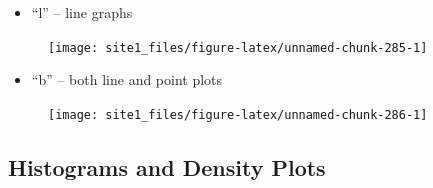 \documentclass[]{book}
\newenvironment{Shaded}{\begin{snugshade}}{\end{snugshade}}
\newcommand{\KeywordTok}[1]{\textcolor[rgb]{0.13,0.29,0.53}{\textbf{#1}}}
\newcommand{\DataTypeTok}[1]{\textcolor[rgb]{0.13,0.29,0.53}{#1}}
\newcommand{\StringTok}[1]{\textcolor[rgb]{0.31,0.60,0.02}{#1}}
\newcommand{\CommentTok}[1]{\textcolor[rgb]{0.56,0.35,0.01}{\textit{#1}}}
\newcommand{\OperatorTok}[1]{\textcolor[rgb]{0.81,0.36,0.00}{\textbf{#1}}}
\newcommand{\NormalTok}[1]{#1}
\providecommand{\tightlist}{%
  \setlength{\itemsep}{0pt}\setlength{\parskip}{0pt}}
\begin{document}
\begin{itemize}
\tightlist
\item
  ``l'' -- line graphs
\end{itemize}

\begin{Shaded}
\end{Shaded}

\begin{figure}

{\centering \texttt{[image: site1\_files/figure-latex/unnamed-chunk-285-1]} 

}

\caption{ }\label{fig:unnamed-chunk-285}
\end{figure}

\begin{itemize}
\tightlist
\item
  ``b'' -- both line and point plots
\end{itemize}

\begin{Shaded}
\end{Shaded}

\begin{figure}

{\centering \texttt{[image: site1\_files/figure-latex/unnamed-chunk-286-1]} 

}

\caption{ }\label{fig:unnamed-chunk-286}
\end{figure}

\subsection{Histograms and Density
Plots}\label{histograms-and-density-plots}
\end{document}
